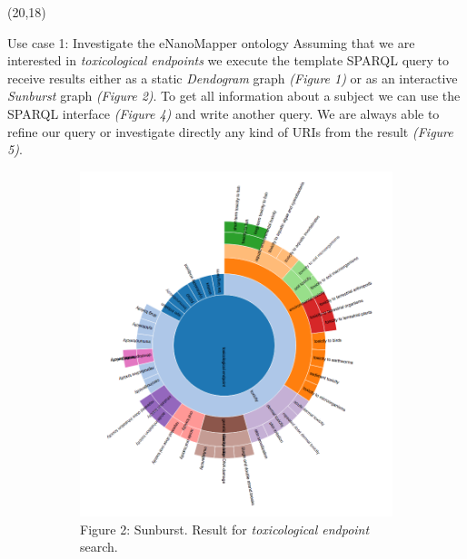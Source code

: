 \documentclass[final]{beamer}
\begin{document}
\begin{frame}{}
    \begin{textblock}{62}(20,18)
      \justifying
      \begin{block}{Use case 1: Investigate the eNanoMapper ontology}
        Assuming that we are interested in \emph{toxicological endpoints} we execute the template SPARQL query to receive results either as a static \emph{Dendogram} graph \emph{(Figure 1)} or as an interactive \emph{Sunburst} graph \emph{(Figure 2)}. To get all information about a subject we can use the SPARQL interface \emph{(Figure 4)} and write another query. We are always able to refine our query or investigate directly any kind of URIs from the result \emph{(Figure 5)}.
        \begin{figure}
          \hspace{-0.15\textwidth}
          \begin{subfigure}[c]{0.3\textwidth}
            \includegraphics[width=\textwidth,keepaspectratio]{onto-use-case-1a.png}
            \caption{Figure 2: Sunburst. Result for \emph{toxicological endpoint} search.}
          \end{subfigure}
          \hspace{0.25\textwidth}
          \begin{subfigure}[c]{0.2\textwidth}

\end{subfigure}
\end{figure}
\end{block}
\end{textblock}
\end{frame}
\end{document}
